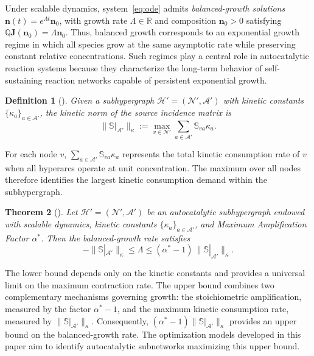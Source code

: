 \documentclass[a4paper,11pt,reqno]{amsart}
\newtheorem{definition}{Definition}[section]
\newtheorem{theorem}[definition]{Theorem}
\begin{document}
Under scalable dynamics, system~\eqref{eq:ode} admits
\emph{balanced-growth solutions}
$\mathbf{n}(t)=e^{\Lambda t}\mathbf{n}_0$,
with growth rate $\Lambda\in\mathbb{R}$ and composition
$\mathbf{n}_0>0$ satisfying
$\mathbb{Q}\mathbf{J}(\mathbf{n}_0)=\Lambda\mathbf{n}_0$.
Thus, balanced growth corresponds to an exponential growth regime in which all
species grow at the same asymptotic rate while preserving constant relative
concentrations. Such regimes play a central role in autocatalytic reaction systems because
they characterize the long-term behavior of self-sustaining reaction networks
capable of persistent exponential growth.
\begin{definition}[\cite{gagrani2026topological}]
\label{def:norma_cinetica}
Given a subhypergraph
$\mathcal{H}'=(\mathcal{N}',\mathcal{A}')$
with kinetic constants $\{\kappa_a\}_{a\in\mathcal{A}'}$, the
\emph{kinetic norm} of the source incidence matrix is
$$
\|\mathbb{S}|_{\mathcal{A}'}\|_\kappa
:=
\max_{v\in\mathcal{N}'}
\sum_{a\in\mathcal{A}'}
\mathbb{S}_{va}\kappa_a.
$$
\end{definition}

For each node $v$, $\sum_{a\in\mathcal{A}'}
\mathbb{S}_{va}\kappa_a$ represents the total kinetic consumption rate of $v$ when all hyperarcs operate
at unit concentration. The maximum over all nodes therefore identifies the
largest kinetic consumption demand within the subhypergraph.

\begin{theorem}[\cite{gagrani2026topological}]
\label{thm:cotas}
Let $\mathcal{H}'=(\mathcal{N}',\mathcal{A}')$ be an autocatalytic 
subhypergraph endowed with scalable dynamics, kinetic constants
$\{\kappa_a\}_{a\in\mathcal{A}'}$, and Maximum Amplification Factor
$\alpha^*$. Then the balanced-growth rate satisfies
$$
-\|\mathbb{S}|_{\mathcal{A}'}\|_\kappa
\le
\Lambda
\le
(\alpha^*-1)\,
\|\mathbb{S}|_{\mathcal{A}'}\|_\kappa.
$$
\end{theorem}

The lower bound depends only on the kinetic constants and provides a universal
limit on the maximum contraction rate. The upper bound combines two
complementary mechanisms governing growth: the stoichiometric amplification,
measured by the factor $\alpha^*-1$, and the maximum kinetic consumption rate,
measured by $\|\mathbb{S}|_{\mathcal{A}'}\|_\kappa$. Consequently,
$(\alpha^*-1)\|\mathbb{S}|_{\mathcal{A}'}\|_\kappa$ provides an upper bound on
the balanced-growth rate. The optimization models developed in this paper aim
to identify autocatalytic subnetworks maximizing this upper bound.
\end{document}
